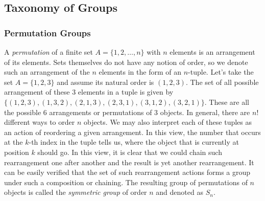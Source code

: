 




\subsection{Taxonomy of Groups}




\subsubsection{Permutation Groups}
A \emph{permutation} of a finite set $A = \{ 1,2,\ldots,n \}$ with $n$ elements is an arrangement of its elements. Sets themselves do not have any notion of order, so we denote such an arrangement of the $n$ elements in the form of an $n$-tuple. Let's take the set $A = \{ 1,2,3 \}$ and assume its natural order is $(1,2,3)$. The set of all possible arrangement of these $3$ elements in a tuple is given by $\{ (1,2,3), (1,3,2), (2,1,3), (2,3,1), (3,1,2), (3,2,1) \}$. These are all the possible $6$ arrangements or permutations of $3$ objects. In general, there are $n!$ different ways to order $n$ objects. We may also interpret each of these tuples as an action of reordering a given arrangement. In this view, the number that occurs at the $k$-th index in the tuple tells us, where the object that is currently at position $k$ should go. In this view, it is clear that we could chain such rearrangement one after another and the result is yet another rearrangement. It can be easily verified that the set of such rearrangement actions forms a group under such a composition or chaining. The resulting group of permutations of $n$ objects is called the \emph{symmetric group} of order $n$ and denoted as $S_n$.



